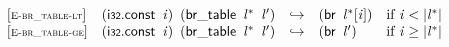 \vspace{1ex}

$$
\begin{array}{@{}l@{}lcl@{}l@{}}
{[\textsc{\scriptsize E{-}br\_table{-}lt}]} \quad & (\mathsf{i{\scriptstyle32}}.\mathsf{const}~\,{\mathit{i}})~\,(\mathsf{br\_table}~\,{{\mathit{l}}^\ast}~\,{\mathit{l}'}) &\hookrightarrow& (\mathsf{br}~\,{{\mathit{l}}^\ast}{}[{\mathit{i}}]) &\quad
  \mbox{if}~{\mathit{i}} < {|{{\mathit{l}}^\ast}|} \\
{[\textsc{\scriptsize E{-}br\_table{-}ge}]} \quad & (\mathsf{i{\scriptstyle32}}.\mathsf{const}~\,{\mathit{i}})~\,(\mathsf{br\_table}~\,{{\mathit{l}}^\ast}~\,{\mathit{l}'}) &\hookrightarrow& (\mathsf{br}~\,{\mathit{l}'}) &\quad
  \mbox{if}~{\mathit{i}} \geq {|{{\mathit{l}}^\ast}|} \\
\end{array}
$$

\vspace{1ex}

